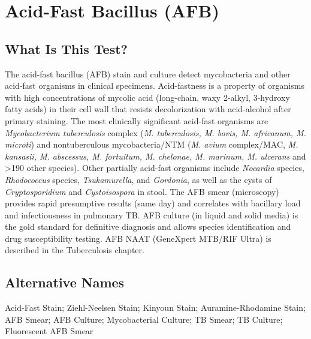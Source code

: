 \chapter{Acid-Fast Bacillus (AFB)}

\section*{What Is This Test?}
The acid-fast bacillus (AFB) stain and culture detect mycobacteria and other acid-fast organisms in clinical specimens. Acid-fastness is a property of organisms with high concentrations of mycolic acid (long-chain, waxy 2-alkyl, 3-hydroxy fatty acids) in their cell wall that resists decolorization with acid-alcohol after primary staining. The most clinically significant acid-fast organisms are \textit{Mycobacterium tuberculosis} complex (\textit{M. tuberculosis, M. bovis, M. africanum, M. microti}) and nontuberculous mycobacteria/NTM (\textit{M. avium} complex/MAC, \textit{M. kansasii, M. abscessus, M. fortuitum, M. chelonae, M. marinum, M. ulcerans} and >190 other species). Other partially acid-fast organisms include \textit{Nocardia} species, \textit{Rhodococcus} species, \textit{Tsukamurella}, and \textit{Gordonia}, as well as the cysts of \textit{Cryptosporidium} and \textit{Cystoisospora} in stool. The AFB smear (microscopy) provides rapid presumptive results (same day) and correlates with bacillary load and infectiousness in pulmonary TB. AFB culture (in liquid and solid media) is the gold standard for definitive diagnosis and allows species identification and drug susceptibility testing. AFB NAAT (GeneXpert MTB/RIF Ultra) is described in the Tuberculosis chapter.

\section*{Alternative Names}
Acid-Fast Stain; Ziehl-Neelsen Stain; Kinyoun Stain; Auramine-Rhodamine Stain; AFB Smear; AFB Culture; Mycobacterial Culture; TB Smear; TB Culture; Fluorescent AFB Smear

